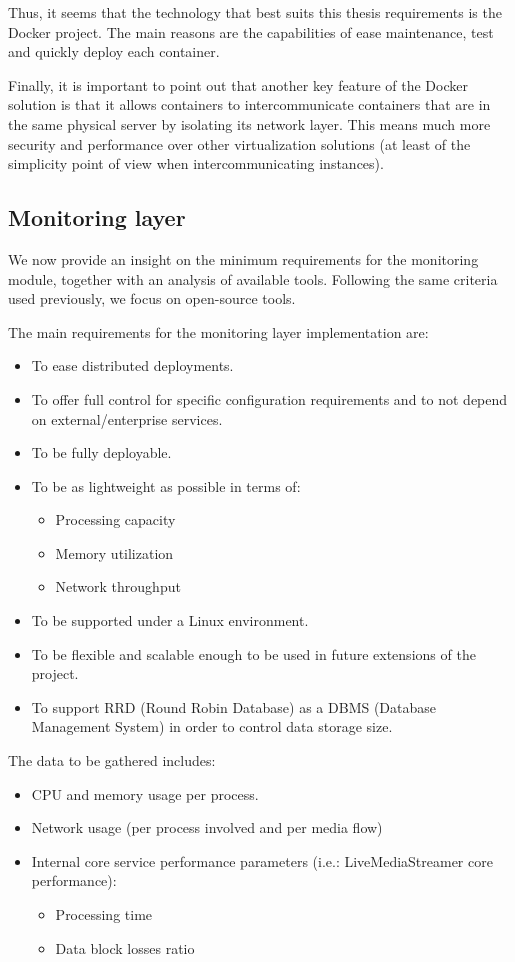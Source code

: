 Thus, it seems that the technology that best suits this thesis requirements is the Docker project. The main reasons are the capabilities of ease maintenance, test and quickly deploy each container. 

Finally, it is important to point out that another key feature of the Docker solution is that it allows containers to intercommunicate containers that are in the same physical server by isolating its network layer. This means much more security and performance over other virtualization solutions (at least of the simplicity point of view when intercommunicating instances).

\subsection{Monitoring layer}

We now provide an insight on the minimum requirements for the monitoring module, together with an analysis of available tools. Following the same criteria used previously, we focus on open-source tools. 

The main requirements for the monitoring layer implementation are:

\begin{itemize}
\item To ease distributed deployments.
\item To offer full control for specific configuration requirements and to not depend on external/enterprise services. 
\item To be fully deployable.
\item To be as lightweight as possible in terms of:
\begin{itemize}
\item Processing capacity
\item Memory utilization
\item Network throughput
\end{itemize}
\item To be supported under a Linux environment.
\item To be flexible and scalable enough to be used in future extensions of the project.
\item To support RRD (Round Robin Database) as a DBMS (Database Management System) in order to control data storage size.
\end{itemize}

The data to be gathered includes:

\begin{itemize}
\item CPU and memory usage per process.
\item Network usage (per process involved and per media flow)
\item Internal core service performance parameters (i.e.: LiveMediaStreamer core performance):
\begin{itemize}
\item Processing time
\item Data block losses ratio
\end{itemize}
\end{itemize}

